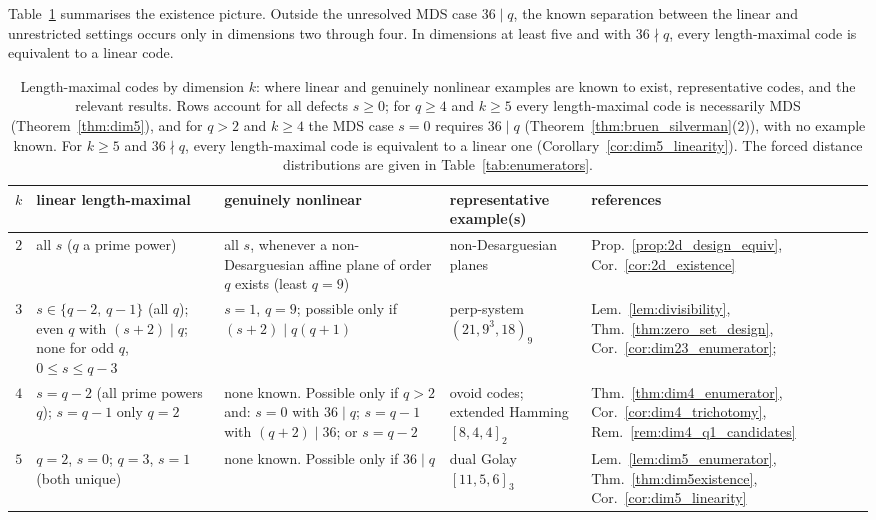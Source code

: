 \documentclass[12pt, letterpaper]{article}
\theoremstyle{plain}
\theoremstyle{definition}
\begin{document}
	Table~\ref{tab:by_dimension} summarises the existence picture. Outside the unresolved MDS case $36\mid q$, the known separation between the linear and unrestricted settings occurs only in dimensions two through four. In dimensions at least five and with $36\nmid q$, every length-maximal code is equivalent to a linear code.

	\begin{table}[htbp]
		\centering
		\small
		\renewcommand{\arraystretch}{1.25}
		\caption{Length-maximal codes by dimension $k$: where linear and genuinely nonlinear examples are known to exist, representative codes, and the relevant results. Rows account for all defects $s \ge 0$; for $q \ge 4$ and $k \ge 5$ every length-maximal code is necessarily MDS (Theorem~\ref{thm:dim5}), and for $q > 2$ and $k \ge 4$ the MDS case $s=0$ requires $36 \mid q$ (Theorem~\ref{thm:bruen_silverman}(2)), with no example known. For $k \ge 5$ and $36 \nmid q$, every length-maximal code is equivalent to a linear one (Corollary~\ref{cor:dim5_linearity}). The forced  distance distributions are given in Table~\ref{tab:enumerators}.}
		\label{tab:by_dimension}
		\begin{tabular}{@{}c >{\raggedright\arraybackslash}p{1.4in} >{\raggedright\arraybackslash}p{1.7in} >{\raggedright\arraybackslash}p{1.35in} >{\raggedright\arraybackslash}p{1in}@{}}
			\toprule
			$k$ & linear length-maximal & genuinely nonlinear & representative example(s) & references \\
			\midrule
			$2$ & all $s$ ($q$ a prime power) &  all $s$, whenever a non-Desarguesian affine plane of order $q$ exists (least $q{=}9$) & non-Desarguesian planes & Prop.~\ref{prop:2d_design_equiv}, Cor.~\ref{cor:2d_existence} \\
			$3$ & $s{\in}\{q{-}2,\,q{-}1\}$ (all $q$); even $q$ with $(s{+}2)\mid q$; none for odd $q$, $0\le s\le q{-}3$ & $s{=}1$, $q{=}9$; possible only if $(s{+}2)\mid q(q{+}1)$ & perp-system $(21,9^3,18)_9$ & Lem.~\ref{lem:divisibility}, Thm.~\ref{thm:zero_set_design}, Cor.~\ref{cor:dim23_enumerator}; \cite{DeClerck2002PerpSystems} \\
			$4$ & $s{=}q{-}2$ (all prime powers $q$); $s{=}q{-}1$ only $q{=}2$ & none known. Possible only if $q>2$ and: $s{=}0$ with $36\mid q$; $s{=}q{-}1$ with $(q{+}2)\mid36$; or $s{=}q{-}2$ & ovoid codes; extended Hamming $[8,4,4]_2$ & Thm.~\ref{thm:dim4_enumerator}, Cor.~\ref{cor:dim4_trichotomy}, Rem.~\ref{rem:dim4_q1_candidates} \\
			$5$ & $q{=}2$, $s{=}0$; $q{=}3$, $s{=}1$ (both unique) & none known. Possible only if $36\mid q$ & dual Golay $[11,5,6]_3$ & Lem.~\ref{lem:dim5_enumerator}, Thm.~\ref{thm:dim5existence}, Cor.~\ref{cor:dim5_linearity} \\

\end{tabular}
\end{table}
\end{document}
